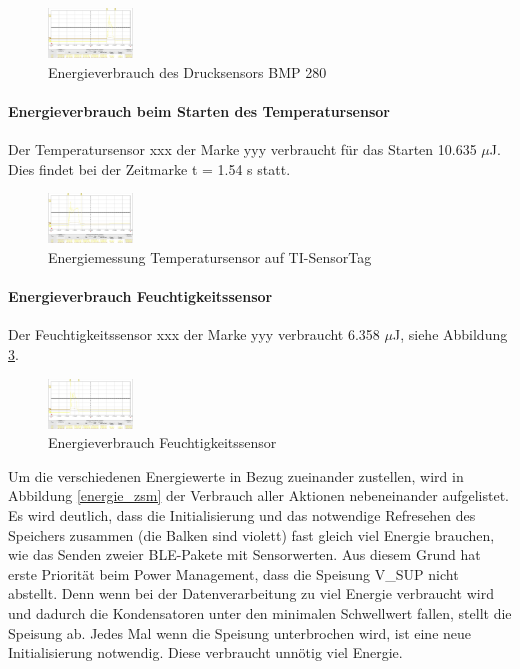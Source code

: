 \begin{figure}[ht]
  \includegraphics[width=0.2\textwidth]{3Vorgehen/imag/Drucksensor.png}
  \caption{Energieverbrauch des Drucksensors BMP 280}
  \label{energie_drucksensor}
\end{figure}

\paragraph{Energieverbrauch beim Starten des Temperatursensor}

Der Temperatursensor xxx der Marke yyy verbraucht für das Starten 10.635 $\mu$J. Dies findet bei der Zeitmarke t = 1.54 s statt.

\begin{figure}[ht]
  \includegraphics[width=0.2\textwidth]{3Vorgehen/imag/tempSensor.png}
  \caption{Energiemessung Temperatursensor auf TI-SensorTag}
  \label{energie_tempsensor}
\end{figure}


\paragraph{Energieverbrauch Feuchtigkeitssensor}

Der Feuchtigkeitssensor xxx der Marke yyy verbraucht 6.358 $\mu$J, siehe Abbildung \ref{energie_humidity}.

\begin{figure}
  \includegraphics[width=0.2\textwidth]{3Vorgehen/imag/Humidity.png}
  \caption{Energieverbrauch Feuchtigkeitssensor}
  \label{energie_humidity}
\end{figure}

Um die verschiedenen Energiewerte in Bezug zueinander zustellen, wird in Abbildung \ref{energie_zsm} der Verbrauch aller Aktionen nebeneinander aufgelistet. Es wird deutlich, dass die Initialisierung und das notwendige Refresehen des Speichers zusammen (die Balken sind violett)  fast gleich viel Energie brauchen, wie das Senden zweier BLE-Pakete mit Sensorwerten. Aus diesem Grund hat erste Priorität beim Power Management, dass die Speisung V\_SUP nicht abstellt. Denn wenn bei der Datenverarbeitung zu viel Energie verbraucht wird und dadurch die Kondensatoren unter den minimalen Schwellwert fallen, stellt die Speisung ab. Jedes Mal wenn die Speisung unterbrochen wird, ist eine neue Initialisierung notwendig. Diese verbraucht unnötig viel Energie.

